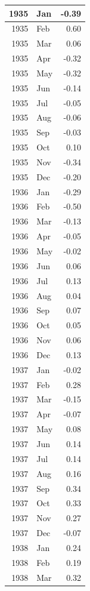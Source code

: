 \documentclass[
]{article}
\begin{document}
\begin{table}[H]
\begin{tabular}[t]{r|l|r}
\hline
1935 & Jan & -0.39\\
\hline
1935 & Feb & 0.60\\
\hline
1935 & Mar & 0.06\\
\hline
1935 & Apr & -0.32\\
\hline
1935 & May & -0.32\\
\hline
1935 & Jun & -0.14\\
\hline
1935 & Jul & -0.05\\
\hline
1935 & Aug & -0.06\\
\hline
1935 & Sep & -0.03\\
\hline
1935 & Oct & 0.10\\
\hline
1935 & Nov & -0.34\\
\hline
1935 & Dec & -0.20\\
\hline
1936 & Jan & -0.29\\
\hline
1936 & Feb & -0.50\\
\hline
1936 & Mar & -0.13\\
\hline
1936 & Apr & -0.05\\
\hline
1936 & May & -0.02\\
\hline
1936 & Jun & 0.06\\
\hline
1936 & Jul & 0.13\\
\hline
1936 & Aug & 0.04\\
\hline
1936 & Sep & 0.07\\
\hline
1936 & Oct & 0.05\\
\hline
1936 & Nov & 0.06\\
\hline
1936 & Dec & 0.13\\
\hline
1937 & Jan & -0.02\\
\hline
1937 & Feb & 0.28\\
\hline
1937 & Mar & -0.15\\
\hline
1937 & Apr & -0.07\\
\hline
1937 & May & 0.08\\
\hline
1937 & Jun & 0.14\\
\hline
1937 & Jul & 0.14\\
\hline
1937 & Aug & 0.16\\
\hline
1937 & Sep & 0.34\\
\hline
1937 & Oct & 0.33\\
\hline
1937 & Nov & 0.27\\
\hline
1937 & Dec & -0.07\\
\hline
1938 & Jan & 0.24\\
\hline
1938 & Feb & 0.19\\
\hline
1938 & Mar & 0.32\\

\end{tabular}
\end{table}
\end{document}
